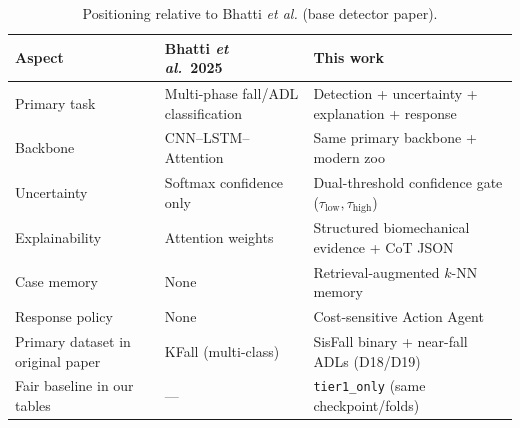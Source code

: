 \begin{table}[!t]
\centering
\caption{Positioning relative to Bhatti \textit{et al.} (base detector paper).}
\label{tab:positioning}
\begin{tabular}{lll}
\toprule
Aspect & Bhatti \textit{et al.}~2025~\cite{bhatti2025beyond} & This work \\
\midrule
Primary task & Multi-phase fall/ADL classification & Detection + uncertainty + explanation + response \\
Backbone & CNN--LSTM--Attention & Same primary backbone + modern zoo \\
Uncertainty & Softmax confidence only & Dual-threshold confidence gate ($\tau_{\mathrm{low}},\tau_{\mathrm{high}}$) \\
Explainability & Attention weights & Structured biomechanical evidence + CoT JSON \\
Case memory & None & Retrieval-augmented $k$-NN memory \\
Response policy & None & Cost-sensitive Action Agent \\
Primary dataset in original paper & KFall (multi-class) & SisFall binary + near-fall ADLs (D18/D19) \\
Fair baseline in our tables & --- & \texttt{tier1\_only} (same checkpoint/folds) \\
\bottomrule
\end{tabular}
\end{table}
